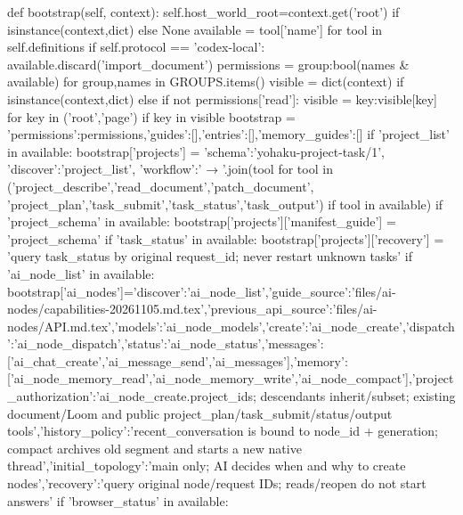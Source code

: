     def bootstrap(self, context):
        self.host_world_root=context.get('root') if isinstance(context,dict) else None
        available = {tool['name'] for tool in self.definitions}
        if self.protocol == 'codex-local':
            available.discard('import_document')
        permissions = {group:bool(names & available) for group,names in GROUPS.items()}
        visible = dict(context) if isinstance(context,dict) else {}
        if not permissions['read']:
            visible = {key:visible[key] for key in ('root','page') if key in visible}
        bootstrap = {'permissions':permissions,'guides':[],'entries':[],'memory_guides':[]}
        if 'project_list' in available:
            bootstrap['projects'] = {'schema':'yohaku-project-task/1', 'discover':'project_list',
                'workflow':' → '.join(tool for tool in ('project_describe','read_document','patch_document',
                    'project_plan','task_submit','task_status','task_output') if tool in available)}
            if 'project_schema' in available:
                bootstrap['projects']['manifest_guide'] = 'project_schema'
            if 'task_status' in available:
                bootstrap['projects']['recovery'] = 'query task_status by original request_id; never restart unknown tasks'
        if 'ai_node_list' in available:
            bootstrap['ai_nodes']={'discover':'ai_node_list','guide_source':'files/ai-nodes/capabilities-20261105.md.tex','previous_api_source':'files/ai-nodes/API.md.tex','models':'ai_node_models','create':'ai_node_create','dispatch':'ai_node_dispatch','status':'ai_node_status','messages':['ai_chat_create','ai_message_send','ai_messages'],'memory':['ai_node_memory_read','ai_node_memory_write','ai_node_compact'],'project_authorization':'ai_node_create.project_ids; descendants inherit/subset; existing document/Loom and public project_plan/task_submit/status/output tools','history_policy':'recent_conversation is bound to node_id + generation; compact archives old segment and starts a new native thread','initial_topology':'main only; AI decides when and why to create nodes','recovery':'query original node/request IDs; reads/reopen do not start answers'}
        if 'browser_status' in available:
